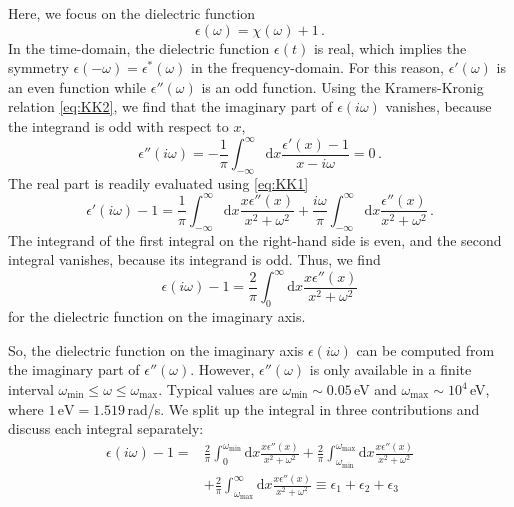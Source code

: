 \documentclass[twocolumn,superscriptaddress,pre]{revtex4-1}
\begin{document}
Here, we focus on the dielectric function
\begin{equation}
\epsilon(\omega)=\chi(\omega)+1 \,.
\end{equation}
In the time-domain, the dielectric function $\epsilon(t)$ is real, which implies the symmetry $\epsilon(-\omega) = \epsilon^*(\omega)$ in the
frequency-domain. For this reason,
$\epsilon'(\omega)$ is an even function while $\epsilon''(\omega)$ is an odd
function. Using the Kramers-Kronig relation \eqref{eq:KK2}, we find that the
imaginary part of $\epsilon(i\omega)$ vanishes, because the integrand is odd
with respect to $x$,
\begin{equation}
\epsilon''(i\omega) = - \frac{1}{\pi} \int_{-\infty}^\infty \mathrm{d}x \frac{\epsilon'(x)-1}{x-i\omega} = 0 \,.
\end{equation}
The real part is readily evaluated using \eqref{eq:KK1}
\begin{equation}
\epsilon'(i\omega)-1 = \frac{1}{\pi} \int_{-\infty}^\infty \mathrm{d}x \frac{x\epsilon''(x)}{x^2+\omega^2} + \frac{i\omega}{\pi} \int_{-\infty}^\infty \mathrm{d}x \frac{\epsilon''(x)}{x^2+\omega^2} \,. 
\end{equation}
The integrand of the first integral on the right-hand side is even, and the
second integral vanishes, because its integrand is odd. Thus, we find
\begin{equation}
\epsilon(i\omega)-1 = \frac{2}{\pi} \int_0^\infty \mathrm{d}x \frac{x\epsilon''(x)}{x^2+\omega^2}
\end{equation}
for the dielectric function on the imaginary axis.

So, the dielectric function on the imaginary axis $\epsilon(i\omega)$ can be
computed from the imaginary part of $\epsilon''(\omega)$. However,
$\epsilon''(\omega)$ is only available in a finite interval
$\omega_\mathrm{min} \le \omega \le \omega_\mathrm{max}$. Typical values are $\omega_\mathrm{min} \sim 0.05\,$eV
and $\omega_\mathrm{max} \sim 10^4\,$eV, where $1\,\mathrm{eV}=1.519\,$rad/s.
We split up the
integral in three contributions and discuss each integral separately:
\begin{align}
\nonumber
\epsilon(i\omega)-1 =&
\frac{2}{\pi} \int_0^{\omega_\mathrm{min}} \mathrm{d}x \frac{x\epsilon''(x)}{x^2+\omega^2} +
\frac{2}{\pi} \int_{\omega_\mathrm{min}}^{\omega_\mathrm{max}} \mathrm{d}x \frac{x\epsilon''(x)}{x^2+\omega^2} \\
&+\frac{2}{\pi} \int_{\omega_\mathrm{max}}^\infty \mathrm{d}x \frac{x\epsilon''(x)}{x^2+\omega^2} \equiv \epsilon_1 + \epsilon_2 + \epsilon_3
\end{align}
\end{document}
